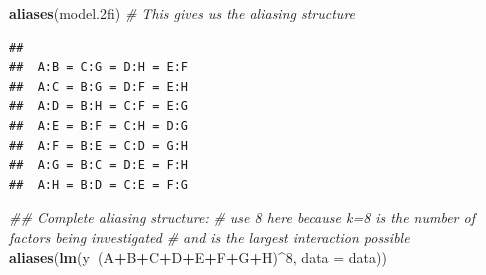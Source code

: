 \documentclass[]{article}
\newenvironment{Shaded}{\begin{snugshade}}{\end{snugshade}}
\newcommand{\CommentTok}[1]{\textcolor[rgb]{0.56,0.35,0.01}{\textit{#1}}}
\newcommand{\DataTypeTok}[1]{\textcolor[rgb]{0.13,0.29,0.53}{#1}}
\newcommand{\DecValTok}[1]{\textcolor[rgb]{0.00,0.00,0.81}{#1}}
\newcommand{\FloatTok}[1]{\textcolor[rgb]{0.00,0.00,0.81}{#1}}
\newcommand{\KeywordTok}[1]{\textcolor[rgb]{0.13,0.29,0.53}{\textbf{#1}}}
\newcommand{\NormalTok}[1]{#1}
\newcommand{\OperatorTok}[1]{\textcolor[rgb]{0.81,0.36,0.00}{\textbf{#1}}}
\begin{document}
\begin{Shaded}
\begin{Highlighting}[]
\KeywordTok{aliases}\NormalTok{(model}\FloatTok{.2}\NormalTok{fi) }\CommentTok{# This gives us the aliasing structure}
\end{Highlighting}
\end{Shaded}

\begin{verbatim}
##                       
##  A:B = C:G = D:H = E:F
##  A:C = B:G = D:F = E:H
##  A:D = B:H = C:F = E:G
##  A:E = B:F = C:H = D:G
##  A:F = B:E = C:D = G:H
##  A:G = B:C = D:E = F:H
##  A:H = B:D = C:E = F:G
\end{verbatim}

\begin{Shaded}
\begin{Highlighting}[]
\CommentTok{## Complete aliasing structure:}
\CommentTok{# use 8 here because k=8 is the number of factors being investigated}
\CommentTok{# and is the largest interaction possible}
\KeywordTok{aliases}\NormalTok{(}\KeywordTok{lm}\NormalTok{(y}\OperatorTok{~}\NormalTok{(A}\OperatorTok{+}\NormalTok{B}\OperatorTok{+}\NormalTok{C}\OperatorTok{+}\NormalTok{D}\OperatorTok{+}\NormalTok{E}\OperatorTok{+}\NormalTok{F}\OperatorTok{+}\NormalTok{G}\OperatorTok{+}\NormalTok{H)}\OperatorTok{^}\DecValTok{8}\NormalTok{, }\DataTypeTok{data =}\NormalTok{ data)) }
\end{Highlighting}
\end{Shaded}
\end{document}
